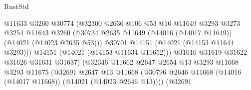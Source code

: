 \begin{lexlean}{RustStd}
\begin{coremodule}
                                            @11633
                                            @3260
                                            @30774
                                            (@32300
                                              @2636
                                              @106
                                              @53
                                              @16
                                              @11649
                                              @3293
                                              @3273
                                              @3254
                                              @11643
                                              @3260
                                              (@30734
                                                @2635
                                                @11649
                                                (@14016 (@14017 @11649))
                                                (@14021 (@14023 @2635 @53)))
                                              @30701
                                              @14151
                                              (@14021 (@14153 @11644 @3293)))
                                            @14151
                                            (@14021 (@14153 @11634 @11652)))
                                          @31616
                                          @31619
                                          @31622
                                          @31626
                                          @31631
                                          @31637)
                                        (@32346
                                          @11662
                                          @2647
                                          @2654
                                          @13
                                          @3293
                                          @11668
                                          @3293
                                          @11675
                                          (@32691
                                            @2647
                                            @13
                                            @11668
                                            (@30796
                                              @2646
                                              @11668
                                              (@14016 (@14017 @11668))
                                              (@14021 (@14023 @2646 @13))))
                                          (@32691

\end{coremodule}
\end{lexlean}
